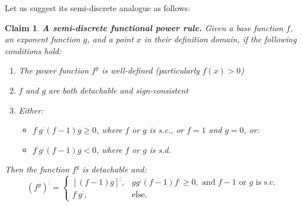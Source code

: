\documentclass[11pt]{book}
\newtheorem{clm}[thm]{Claim}
\begin{document}
Let us suggest its semi-discrete analogue as follows:
\begin{clm}\textbf{A semi-discrete functional power rule.} Given a base function $f$, an exponent function $g$, and a point $x$ in their definition domain, if the following conditions hold:

\begin{enumerate}
\item The power function $f^{g}$ is well-defined (particularly $f\left(x\right)>0$)
\item $f$ and $g$ are both detachable and sign-consistent
\item Either:
\begin{itemize}
\item $f^{;}g^{;}\left(f-1\right)g\geq0$, where $f$ or $g$ is s.c., or $f=1$ and $g=0$, or:
\item $f^{;}g^{;}\left(f-1\right)g<0$, where $f$ or $g$ is s.d.
\end{itemize}
\label{functional_power_rule_detachment}
\end{enumerate}

Then the function $f^{g}$ is detachable and:
$$\left(f^{g}\right)^{;}=\begin{cases}
\left[\left(f-1\right)g\right]^{;}, & gg^{;}\left(f-1\right)f^{;}\geq0,\text{ and }f-1\text{ or }g\text{ is s.c.}\\
f^{;}g^{;}, & \text{else.}
\end{cases}$$
\end{clm}
\end{document}
